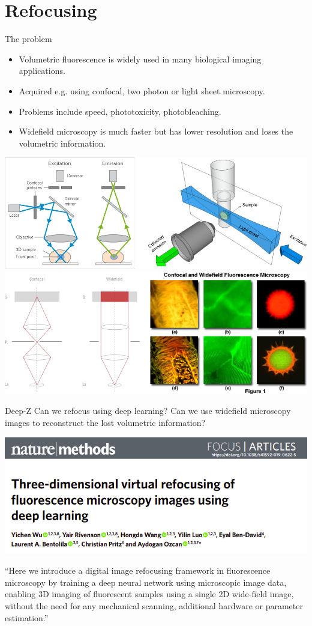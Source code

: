 \documentclass[9pt, aspectratio=169]{beamer}
\begin{document}
\section{Refocusing}

\begin{frame}
    {The problem}
    \begin{itemize}[<+->]
        \item Volumetric fluorescence is widely used in many biological imaging applications.
        \item Acquired e.g. using confocal, two photon or light sheet microscopy.
        \item Problems include speed, phototoxicity, photobleaching.
        \item Widefield microscopy is much faster but has lower resolution and loses the volumetric information.
    \end{itemize}

    {
        \centering
        \includegraphics[width=.8\textwidth]{confocal_lightsheet.png}
    }
    {
        \centering
        \includegraphics[width=.8\textwidth]{Confocal_vs_Widefield.png}
    }
\end{frame}

\begin{frame}
    {Deep-Z}
    Can we refocus using deep learning?
    Can we use widefield microscopy images to reconstruct the lost volumetric information?

    \centering
    \includegraphics[width=.8\textwidth]{wu_2019_title.png}

    \pause
    \raggedright
    ``Here we introduce a digital image refocusing framework in fluorescence microscopy by training a deep neural network using microscopic image data, enabling 3D imaging of fluorescent samples using a single 2D wide-field image, without the need for any
    mechanical scanning, additional hardware or parameter estimation.''
\end{frame}
\end{document}
